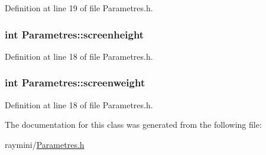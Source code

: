 Definition at line 19 of file Parametres.h.

\hypertarget{class_parametres_a662b45f0f2015742a2daf370842f760c}{
\subsubsection[{screenheight}]{\setlength{\rightskip}{0pt plus 5cm}int {\bf Parametres::screenheight}}}
\label{class_parametres_a662b45f0f2015742a2daf370842f760c}


Definition at line 18 of file Parametres.h.

\hypertarget{class_parametres_a27f7c42bbf966d9f0752c8462d246c1e}{
\subsubsection[{screenweight}]{\setlength{\rightskip}{0pt plus 5cm}int {\bf Parametres::screenweight}}}
\label{class_parametres_a27f7c42bbf966d9f0752c8462d246c1e}


Definition at line 18 of file Parametres.h.



The documentation for this class was generated from the following file:\begin{DoxyCompactItemize}
\item 
raymini/\hyperlink{_parametres_8h}{Parametres.h}\end{DoxyCompactItemize}
